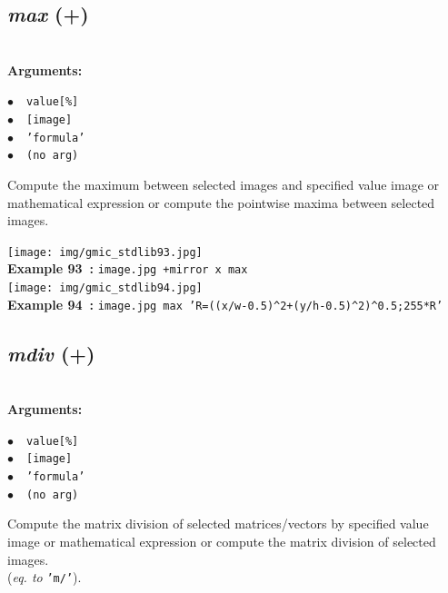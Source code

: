\documentclass[a4paper,10.5pt,twoside]{book}
\def\comma{\discretionary{,}{}{,}}
\newcommand{\Cb}[1]{\textcolor{cb}{#1}}
\begin{document}
\subsection{\emph{max} (+)}\vspace*{-0.7em}
~\\\textbf{\Cb{Arguments: }}\begin{flushleft}
{\small \Cb{\hspace*{0.5cm}$\bullet$~~\texttt{value[\%]}}}~~~\\
{\small \Cb{\hspace*{0.5cm}$\bullet$~~\texttt{[image]}}}~~~\\
{\small \Cb{\hspace*{0.5cm}$\bullet$~~\texttt{'formula'}}}~~~\\
{\small \Cb{\hspace*{0.5cm}$\bullet$~~\texttt{(no arg)}}}\end{flushleft}
Compute the maximum between selected images and specified value{\comma} image or
mathematical expression{\comma} or compute the pointwise maxima between selected images.
\begin{center}\texttt{[image: img/gmic\_stdlib93.jpg]}\\
{\footnotesize \textbf{Example 93~:} \texttt{image.jpg +mirror x max}}
\\\texttt{[image: img/gmic\_stdlib94.jpg]}\\
{\footnotesize \textbf{Example 94~:} \texttt{image.jpg max 'R=((x/w-0.5)\textasciicircum 2+(y/h-0.5)\textasciicircum 2)\textasciicircum 0.5;255*R'}}
\end{center}

\subsection{\emph{mdiv} (+)}\vspace*{-0.7em}
~\\\textbf{\Cb{Arguments: }}\begin{flushleft}
{\small \Cb{\hspace*{0.5cm}$\bullet$~~\texttt{value[\%]}}}~~~\\
{\small \Cb{\hspace*{0.5cm}$\bullet$~~\texttt{[image]}}}~~~\\
{\small \Cb{\hspace*{0.5cm}$\bullet$~~\texttt{'formula'}}}~~~\\
{\small \Cb{\hspace*{0.5cm}$\bullet$~~\texttt{(no arg)}}}\end{flushleft}
Compute the matrix division of selected matrices/vectors by specified value{\comma} image or
mathematical expression{\comma} or compute the matrix division of selected images.
~\\(\emph{eq. to} {\small \texttt{'m/'}}).
\end{document}
